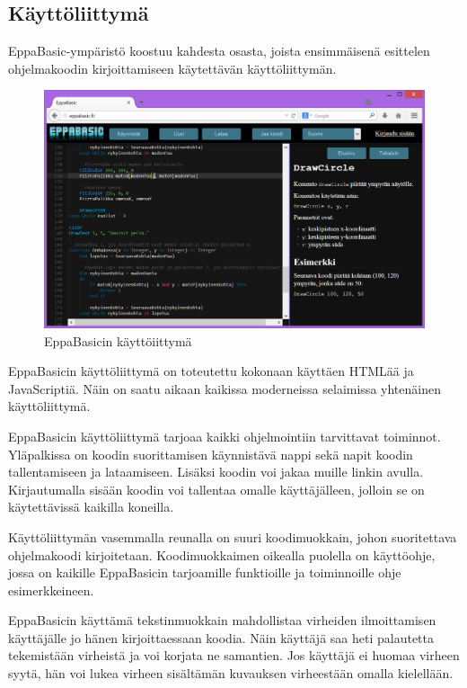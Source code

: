 \subsection{Käyttöliittymä}
EppaBasic-ympäristö koostuu kahdesta osasta,
joista ensimmäisenä esittelen ohjelmakoodin
kirjoittamiseen käytettävän käyttöliittymän.

\begin{figure}[h]
    \centering
    \includegraphics[width=1\textwidth]{kayttoliittyma}
    \caption{EppaBasicin käyttöiittymä}
    \label{img:kayttoliittyma}
\end{figure}

EppaBasicin käyttöliittymä on toteutettu
kokonaan käyttäen HTMLää ja JavaScriptiä.
Näin on saatu aikaan kaikissa moderneissa
selaimissa yhtenäinen käyttöliittymä.

EppaBasicin käyttöliittymä tarjoaa kaikki
ohjelmointiin tarvittavat toiminnot.
Yläpalkissa on koodin suorittamisen käynnistävä
nappi sekä napit koodin tallentamiseen ja lataamiseen.
Lisäksi koodin voi jakaa muille linkin avulla.
Kirjautumalla sisään koodin voi tallentaa
omalle käyttäjälleen, jolloin se on käytettävissä
kaikilla koneilla.

Käyttöliittymän vasemmalla reunalla on
suuri koodimuokkain, johon suoritettava
ohjelmakoodi kirjoitetaan.
Koodimuokkaimen oikealla puolella on
käyttöohje, jossa on kaikille
EppaBasicin tarjoamille funktioille
ja toiminnoille ohje esimerkkeineen.

EppaBasicin käyttämä tekstinmuokkain mahdollistaa
virheiden ilmoittamisen käyttäjälle jo hänen
kirjoittaessaan koodia.
Näin käyttäjä saa heti palautetta tekemistään
virheistä ja voi korjata ne samantien.
Jos käyttäjä ei huomaa virheen syytä,
hän voi lukea virheen sisältämän
kuvauksen virheestään omalla kielellään.

